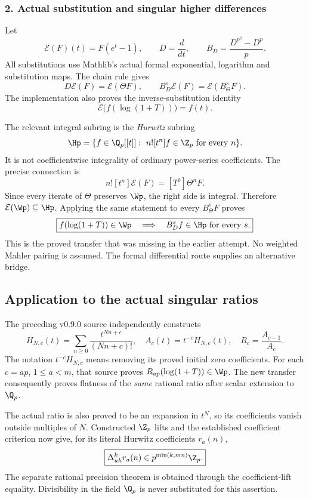 \subsubsection*{2. Actual substitution and singular higher differences}
Let
\[
 \mathcal E(F)(t)=F(e^t-1),\qquad D=\frac{d}{dt},\qquad
 B_D=\frac{D^{p^2}-D^p}{p}.
\]
All substitutions use Mathlib's actual formal exponential, logarithm and substitution maps. The chain rule gives
\[
 D\mathcal E(F)=\mathcal E(\Theta F),\qquad
 B_D^s\mathcal E(F)=\mathcal E(B_\Theta^sF).
\]
The implementation also proves the inverse-substitution identity
\[
 \mathcal E\bigl(f(\log(1+T))\bigr)=f(t).
\]

The relevant integral subring is the \emph{Hurwitz} subring
\[
 \Hp=\{f\in\Q_p[[t]]:\ n![t^n]f\in\Z_p\ \text{for every }n\}.
\]
It is not coefficientwise integrality of ordinary power-series coefficients. The precise connection is
\[
 n![t^n]\mathcal E(F)=[T^0]\Theta^nF.
\]
Since every iterate of $\Theta$ preserves $\Wp$, the right side is integral. Therefore $\mathcal E(\Wp)\subseteq\Hp$. Applying the same statement to every $B_\Theta^sF$ proves
\[
 \boxed{f(\log(1+T))\in\Wp\quad\Longrightarrow\quad
 B_D^sf\in\Hp\text{ for every }s.}
\]
This is the proved transfer that was missing in the earlier attempt. No weighted Mahler pairing is assumed. The formal differential route supplies an alternative bridge.

\subsection*{Application to the actual singular ratios}
The preceding v0.9.0 source independently constructs
\[
 H_{N,c}(t)=\sum_{n\ge0}\frac{t^{Nn+c}}{(Nn+c)!},\quad
 A_c(t)=t^{-c}H_{N,c}(t),\quad R_c=\frac{A_{c-1}}{A_c}.
\]
The notation $t^{-c}H_{N,c}$ means removing its proved initial zero coefficients. For each $c=ap$, $1\le a<m$, that source proves
$R_{ap}(\log(1+T))\in\Wp$. The new transfer consequently proves flatness of the \emph{same} rational ratio after scalar extension to $\Q_p$.

The actual ratio is also proved to be an expansion in $t^N$, so its coefficients vanish outside multiples of $N$. Constructed $\Z_p$ lifts and the established coefficient criterion now give, for its literal Hurwitz coefficients $r_a(n)$,
\[
 \boxed{\Delta_{uh}^{k}r_a(n)\in p^{\min(k,mn)}\Z_p.}
\]
The separate rational precision theorem is obtained through the coefficient-lift equality. Divisibility in the field $\Q_p$ is never substituted for this assertion.

